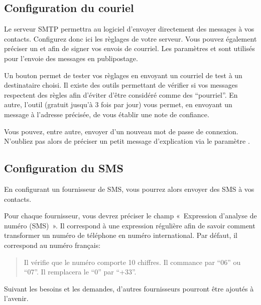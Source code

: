 \documentclass[a4paper,10pt,oneside,french]{sphinxmanual}
\begin{document}
\subsection{Configuration du couriel}
\label{\detokenize{mailing/configuration:configuration-du-couriel}}
Le serveur SMTP permettra au logiciel d’envoyer directement des messages à vos contacts.
Configurez donc ici les règlages de votre serveur.
Vous pouvez également préciser un  et  afin de signer vos envois de courriel.
Les paramètres  et  sont utilisés pour l’envoie des messages en publipostage.

Un bouton  permet de tester vos règlages en envoyant un courriel de test à un destinataire choisi.
Il existe des outils permettant de vérifier si vos messages respectent des règles afin d’éviter d’être considéré comme des “pourriel”.
En autre, l’outil  (gratuit jusqu’à 3 fois par jour) vous permet, en envoyant un message à l’adresse précisée, de vous établir une note de confiance.

Vous pouvez, entre autre, envoyer d’un nouveau mot de passe de connexion.
N’oubliez pas alors de préciser un petit message d’explication via le paramètre .


\subsection{Configuration du SMS}
\label{\detokenize{mailing/configuration:configuration-du-sms}}
En configurant un fournisseur de SMS, vous pourrez alors envoyer des SMS à vos contacts.

Pour chaque fournisseur, vous devrez préciser le champ « Expression d’analyse de numéro (SMS) ».
Il correspond à une expression régulière afin de savoir comment transformer un numéro de téléphone en numéro international.
Par défaut, il correspond au numéro français: 
\begin{quote}

Il vérifie que le numéro comporte 10 chiffres.
Il commance par “06” ou “07”.
Il remplacera le “0” par “+33”.
\end{quote}

Suivant les besoins et les demandes, d’autres fournisseurs pourront être ajoutés à l’avenir.
\end{document}
